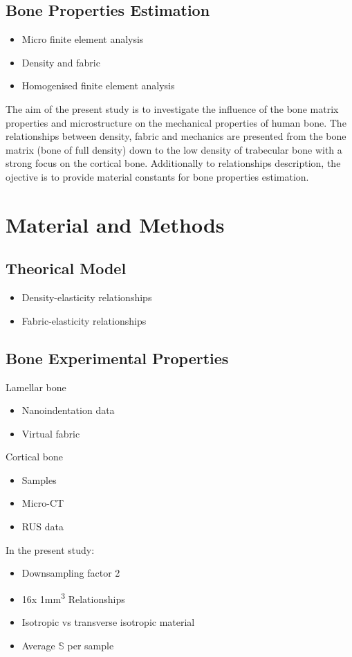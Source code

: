 \documentclass[a4paper,fleqn]{DC_ArtStyle}
\begin{document}
	\subsection{Bone Properties Estimation}
	\begin{itemize}
		\item Micro finite element analysis
		\item Density and fabric
		\item Homogenised finite element analysis
	\end{itemize}
	The aim of the present study is to investigate the influence of the bone matrix properties and microstructure on the mechanical properties of human bone.
	The relationships between density, fabric and mechanics are presented from the bone matrix (bone of full density) down to the low density of trabecular bone with a strong focus on the cortical bone.
	Additionally to relationships description, the ojective is to provide material constants for bone properties estimation.

	
	\newpage
	\section{Material and Methods}
	\subsection{Theorical Model}
	\begin{itemize}
		\item Density-elasticity relationships
		\item Fabric-elasticity relationships
	\end{itemize}

	\subsection{Bone Experimental Properties}
	Lamellar bone
	\begin{itemize}
		\item Nanoindentation data
		\item Virtual fabric
	\end{itemize}

	Cortical bone
	\begin{itemize}
		\item Samples
		\item Micro-CT
		\item RUS data
	\end{itemize}
	In the present study:
	\begin{itemize}
		\item Downsampling factor 2
		\item 16x 1mm\textsuperscript{3} Relationships
		\item Isotropic vs transverse isotropic material
		\item Average $\mathbb{S}$ per sample
	\end{itemize}
\end{document}
